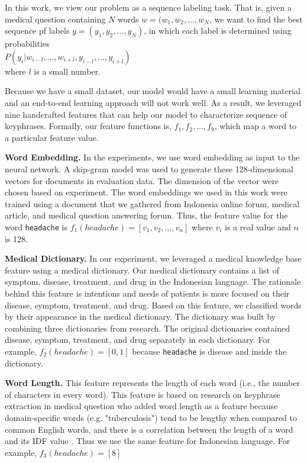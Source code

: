 In this work, we view our problem as a sequence labeling task. That is, given a medical question containing $N$ words $w = (w_1, w_2,...,w_N$, we want to find the best sequence pf labels $y = (y_1, y_2,..., y_N)$, in which each label is determined using probabilities \\$P(y_i|w_{i-l},...,w_{i+l},y_{i-l},...,y_{i+l})$ \\where $l$ is a small number.

Because we have a small dataset, our model would have a small learning material and an end-to-end learning approach will not work well. As a result, we leveraged nine handcrafted features that can help our model to characterize sequence of keyphrases. Formally, our feature functions is, $f_1, f_2, ..., f_9$, which map a word to a particular feature value.
    
    \textbf{Word Embedding.} In the experiments, we use word embedding as input to the neural network. A skip-gram model \cite{mikolov2013wordembed} was used to generate these 128-dimensional vectors for documents in evaluation data. The dimension of the vector were chosen based on \cite{skripsiWahid} experiment. The word embeddings we used in this work were trained using a document that we gathered from Indonesia online forum, medical article, and medical question answering forum. Thus, the feature value for the word \texttt{headache} is $f_1(headache) = [v_1, v_2, ..., v_n]$ where $v_i$ is a real value and $n$ is 128.
    
    \textbf{Medical Dictionary.} In our experiment, we leveraged a medical knowledge base feature using a medical dictionary. Our medical dictionary contains a list of symptom, disease, treatment, and drug in the Indonesian language. The rationale behind this feature is intentions and needs of patients is more focused on their disease, symptom, treatment, and drug. Based on this feature, we classified words by their appearance in the medical dictionary. The dictionary was built by combining three dictionaries from \cite{skripsiKakAbid} research. The original dictionaries contained disease, symptom, treatment, and drug separately in each dictionary. For example, $f_2(headache) = [0, 1]$ because \texttt{headache} is disease and inside the dictionary.
    
    \textbf{Word Length.} This feature represents the length of each word (i.e., the number of characters in every word). This feature is based on \cite{cao2010automatically} research on keyphrase extraction in medical question who added word length as a feature because domain-specific words (e.g. "tuberculosis") tend to be lengthy when compared to common English words, and there is a correlation between the length of a word and its IDF value \citep{cao2010automatically}. Thus we use the same feature for Indonesian language. For example, $f_3(headache) = [8]$
    
